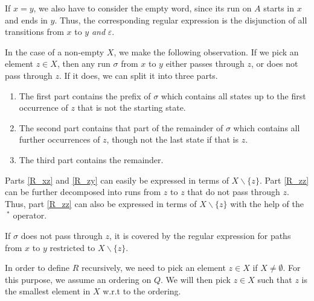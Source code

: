 If $x = y$, we also have to consider the empty word, since its run on $A$ starts in $x$ and ends in $y$.
Thus, the corresponding regular expression is the disjunction of all transitions from $x$ to $y$ \textit{and} $\varepsilon$.


In the case of a non-empty $X$, we make the following observation. 
If we pick an element $z \in X$, then any run $\sigma$ from $x$ to $y$ either passes through $z$, or does not pass through $z$.
If it does, we can split it into three parts.
\begin{enumerate}[label=(\roman*)]
    \item  \label{R_xz}
        The first part contains the prefix of $\sigma$ which contains all states up to the first occurrence of $z$ that is not the starting state.
    \item  \label{R_zz}
        The second part contains that part of the remainder of $\sigma$ which contains all further occurrences of $z$, though not the last state if that is $z$.
    \item  \label{R_zy}
        The third part contains the remainder.
\end{enumerate}

Parts \ref{R_xz} and \ref{R_zy} can easily be expressed in terms of $X\backslash\{z\}$.
Part \ref{R_zz} can be further decomposed into runs from $z$ to $z$ that do not pass through $z$.
Thus, part \ref{R_zz} can also be expressed in terms of $X\backslash\{z\}$ with the help of the $\ ^*$ operator.

If $\sigma$ does not pass through $z$, it is covered by the regular expression for paths from $x$ to $y$ restricted to $X\backslash\{z\}$.

In order to define $R$ recursively, we need to pick an element $z \in X$ if $X \neq \emptyset$. 
For this purpose, we assume an ordering on $Q$.
We will then pick $z \in X$ such that $z$ is the smallest element in $X$ w.r.t to the ordering. 

